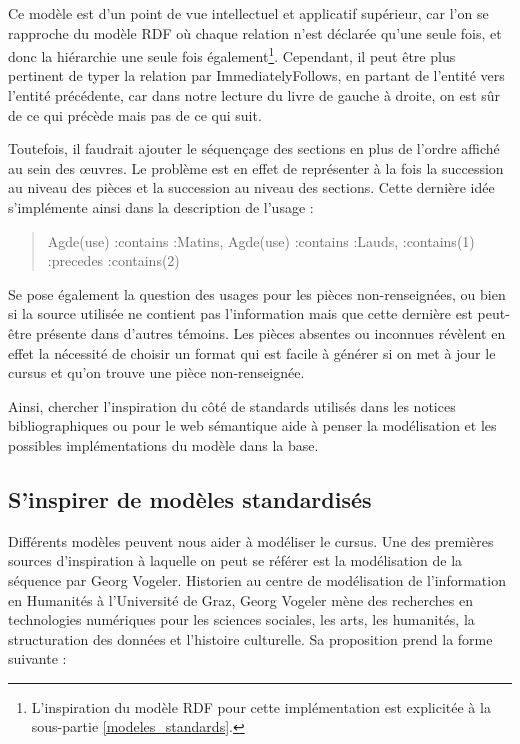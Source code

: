 \documentclass[a4paper,12pt,twoside]{book}
\begin{document}
Ce modèle est d'un point de vue intellectuel et applicatif supérieur, car l'on se rapproche du modèle RDF où chaque relation n'est déclarée qu’une seule fois, et donc la hiérarchie une seule fois également\footnote{L'inspiration du modèle RDF pour cette implémentation est explicitée à la sous-partie \ref{modeles_standards}.}. Cependant, il peut être plus pertinent de typer la relation par \og ImmediatelyFollows\fg{}, en partant de l’entité vers l'entité précédente, car dans notre lecture du livre de gauche à droite, on est sûr de ce qui précède mais pas de ce qui suit. 

Toutefois, il faudrait ajouter le séquençage des sections en plus de l’ordre affiché au sein des œuvres. Le problème est en effet de représenter à la fois la succession au niveau des pièces et la succession au niveau des sections. Cette dernière idée s’implémente ainsi dans la description de l’usage : 
\begin{quote}
Agde(use) :contains :Matins, Agde(use) :contains :Lauds, :contains(1) :precedes :contains(2)
\end{quote}

Se pose également la question des usages pour les pièces non-renseignées, ou bien si la source utilisée ne contient pas l’information mais que cette dernière est peut-être présente dans d’autres témoins. Les pièces absentes ou inconnues révèlent en effet la nécessité de choisir un format qui est facile à générer si on met à jour le cursus et qu’on trouve une pièce non-renseignée. 

Ainsi, chercher l'inspiration du côté de standards utilisés dans les notices bibliographiques ou pour le web sémantique aide à penser la modélisation et les possibles implémentations du modèle dans la base.

	
	\subsection{\label{modeles_standards}S’inspirer de modèles standardisés}
	
	Différents modèles peuvent nous aider à modéliser le cursus. Une des premières sources d'inspiration à laquelle on peut se référer est la modélisation de la séquence par Georg Vogeler. Historien au centre de modélisation de l'information en Humanités à l'Université de Graz, Georg Vogeler mène des recherches en technologies numériques pour les sciences sociales, les arts, les humanités, la structuration des données et l'histoire culturelle. Sa proposition prend la forme suivante :
	
\end{document}
